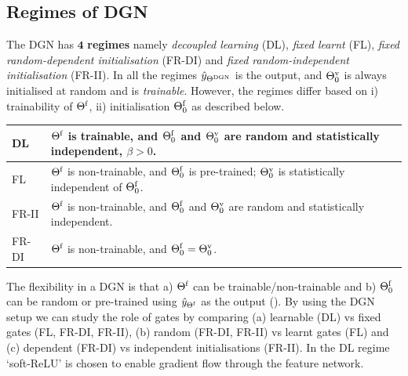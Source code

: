\subsection{Regimes of DGN}
\begin{definition}\label{rm:regime}The DGN has $\mathbf{4}$ \textbf{regimes} namely \emph{decoupled learning} (DL), \emph{fixed learnt} (FL), \emph{fixed random-dependent initialisation} (FR-DI) and \emph{fixed random-independent initialisation} (FR-II). 
In all the regimes $\hat{y}_{\Theta^{\text{DGN}}}$ is the output, and ${\Theta}^{\text{v}}_0$ is always initialised at random and is \emph{trainable}. However, the regimes differ based on i) trainability of $\Theta^{\textrm{f}}$, ii) initialisation $\Theta^{\textrm{f}}_0$ as described below.\\
\begin{tabular}{|l|p{6cm}|}\hline
DL               & $\Theta^{\textrm{f}}$ is trainable, and $\Theta^{\textrm{f}}_0$ and ${\Theta}^{\text{v}}_0$ are random and statistically independent,  $\beta>0$.\\\hline
FL               & $\Theta^{\textrm{f}}$ is non-trainable, and $\Theta^{\textrm{f}}_0$ is pre-trained;  ${\Theta}^{\text{v}}_0$ is statistically independent of $\Theta^{\textrm{f}}_0$. \\\hline
FR-II            & $\Theta^{\textrm{f}}$ is non-trainable, and $\Theta^{\textrm{f}}_0$ and ${\Theta}^{\text{v}}_0$ are random and statistically independent.\\\hline
FR-DI   &  $\Theta^{\textrm{f}}$ is non-trainable, and $\Theta^{\textrm{f}}_0={\Theta}^{\text{v}}_0$.\\\hline
\end{tabular}
\end{definition}
The flexibility in a DGN is that  a) $\Theta^{\textrm{f}}$ can be trainable/non-trainable and b) $\Theta^{\textrm{f}}_0$ can be random or pre-trained using $\hat{y}_{{\Theta}^{\text{f}}}$ as the output (). By using the DGN setup we can study the role of gates by comparing (a) learnable (DL) vs fixed gates (FL, FR-DI, FR-II), (b) random (FR-DI, FR-II) vs learnt gates (FL) and (c) dependent (FR-DI) vs independent initialisations (FR-II). In the DL regime `soft-ReLU' is chosen to enable gradient flow through the feature network.
